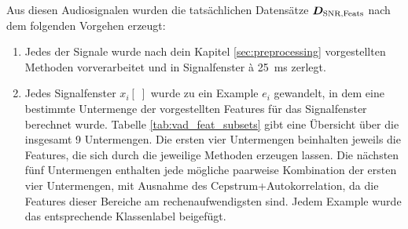 Aus diesen Audiosignalen wurden die tatsächlichen Datensätze $\boldmath{D_{\text{SNR,Feats}}}$ nach dem folgenden Vorgehen erzeugt:

\begin{enumerate}
\item Jedes der Signale wurde nach dein Kapitel \ref{sec:preprocessing} vorgestellten Methoden vorverarbeitet und in Signalfenster \`{a} \SI{25}{\milli\second} zerlegt.
\item Jedes Signalfenster $x_i[\;]$ wurde zu ein Example $e_i$ gewandelt, in dem eine bestimmte Untermenge der vorgestellten Features für das Signalfenster berechnet wurde. Tabelle \ref{tab:vad_feat_subsets} gibt eine Übersicht über die insgesamt 9 Untermengen. Die ersten vier Untermengen beinhalten jeweils die Features, die sich durch die jeweilige Methoden erzeugen lassen. Die nächsten fünf Untermengen enthalten jede mögliche paarweise Kombination der ersten vier Untermengen, mit Ausnahme des Cepstrum+Autokorrelation, da die Features dieser Bereiche am rechenaufwendigsten sind. Jedem Example wurde das entsprechende Klassenlabel beigefügt.


\end{enumerate}
